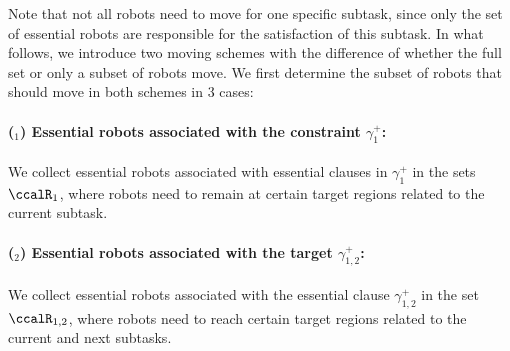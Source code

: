 \documentclass[Afour,sageh,times]{sagej}
\newcounter{mycounter}
\begin{document}
{{ Note that not all robots need to move for one specific subtask, since only the set of essential robots are responsible for the satisfaction of this subtask. In what follows, we introduce two moving schemes with the difference of whether the full set or only a subset of robots move.   We first determine the subset of robots that should move in both schemes in 3 cases:
 \paragraph{($_1$) Essential robots associated with the constraint $\gamma_1^+$:}\label{sec:essential_a} We collect essential robots associated with essential clauses in $\gamma_{1}^{+}$ in the sets $\ccalR_{1}$,  where robots need to remain at certain target regions related to the current subtask.
 \paragraph{($_2$) Essential robots associated with the target $\gamma_{1,2}^{+}$:}\label{sec:essential_b}  We collect essential robots associated with the essential clause  $\gamma_{1,2}^{+}$ in the set $\ccalR_{1,2}$, where  robots need to reach certain target regions related to the current and next subtasks.
}}
\end{document}
